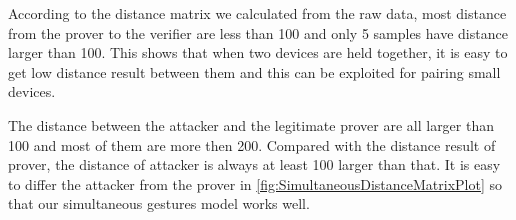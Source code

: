 According to the distance matrix we calculated from the raw data, most distance from the prover to the verifier are less than 100 and only 5 samples have distance larger than 100. This shows that when two devices are held together, it is easy to get low distance result between them and this can be exploited for pairing small devices.

The distance between the attacker and the legitimate prover are all larger than 100 and most of them are more then 200. Compared with the distance result of prover, the distance of attacker is always at least 100 larger than that. It is easy to differ the attacker from the prover in  \autoref{fig:SimultaneousDistanceMatrixPlot} so that our simultaneous gestures model works well. 






 

